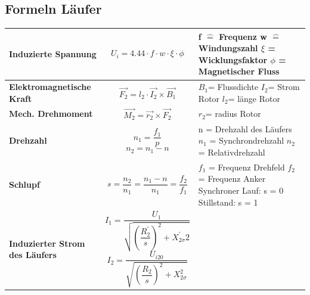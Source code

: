 \subsection{Formeln Läufer}
    \begin{longtable}{| p{} | p{} | p{} |}
    	\hline
    	\textbf{Induzierte Spannung} &
        \[ U_i = 4.44\cdot f\cdot w\cdot\xi\cdot\phi \] &
        f $\widehat{=}$ Frequenz \newline
        w $\widehat{=}$ Windungszahl \newline
        $\xi$ = Wicklungsfaktor \newline
        $\phi$ = Magnetischer Fluss
        \\ \hline
        
        \textbf{Elektromagnetische Kraft}	&
        \begin{equation*} \vec{F_2} = l_2\cdot\vec{I_2}\times\vec{B_1}\end{equation*} &
        $ B_1 $= Flussdichte\newline
        $ I_2 $= Strom Rotor        
        $ l_2 $= länge Rotor\newline
        \\ \hline
        
        \textbf{Mech. Drehmoment}	&
        \begin{equation*}\vec{M_2} = \vec{r_2}\times\vec{F_2}\end{equation*}&
        $ r_2 $= radius Rotor
        \\ \hline
        
        \textbf{Drehzahl}&
        \[ n_1= \frac{f_1}{p}\]
        \[ n_2=n_1 - n \]&
        n = Drehzahl des Läufers \newline
        $n_1$ = Synchrondrehzahl \newline
        $ n_2 $ = Relativdrehzahl
        \\ \hline
        
        \textbf{Schlupf}&
        \[ s= \frac{n_2}{n_1}=\frac{n_1-n}{n_1}=\frac{f_2}{f_1} \]&
        $ f_1 $ = Frequenz Drehfeld \newline
        $ f_2 $ = Frequenz Anker \newline
        Synchroner Lauf: s = 0 \newline
        Stillstand: s = 1
        \\ \hline 
        
        \textbf{Induzierter Strom des Läufers}&
	     \[ I_1 = \frac{U_{1}}{\sqrt{\left(\dfrac{R_2^\prime}{s}\right)^2+X_{2\sigma}^\prime2}} \]
         \[ I_2 = \frac{U_{i20}}{\sqrt{\left(\dfrac{R_2}{s}\right)^2+X_{2\sigma}^2}} \]&
         \\ \hline
            

\end{longtable}
